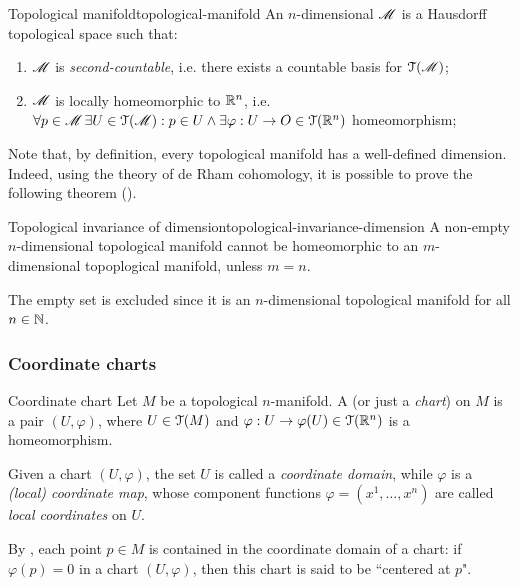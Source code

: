\begin{definition}{Topological manifold}{topological-manifold}
  An $ n $-dimensional  $ \mathscr{M} $ is a Hausdorff topological space such that:
  \begin{enumerate}
    \item $ \mathscr{M} $ is \emph{second-countable}, i.e. there exists a countable basis for $ \EuScript{T}(\mathscr{M}) $;
    \item $ \mathscr{M} $ is locally homeomorphic to $ \mathbb{R}^n $, i.e. $ \forall p\in\mathscr{M} \, \exists U \in \EuScript{T}(\mathscr{M}) : p \in U \land \exists \varphi : U \rightarrow O \in \EuScript{T}(\mathbb{R}^n) $ homeomorphism;
  \end{enumerate}
\end{definition}

Note that, by definition, every topological manifold has a well-defined dimension. Indeed, using the theory of de Rham cohomology, it is possible to prove the following theorem ().

\begin{theorem}{Topological invariance of dimension}{topological-invariance-dimension}
  A non-empty $ n $-dimensional topological manifold cannot be homeomorphic to an $ m $-dimensional topoplogical manifold, unless $ m = n $.
\end{theorem}

The empty set is excluded since it is an $ n $-dimensional topological manifold for all $ n \in \mathbb{N} $.

\subsubsection{Coordinate charts}

\begin{definition}{Coordinate chart}{}
  Let $ M $ be a topological $ n $-manifold. A  (or just a \emph{chart}) on $ M $ is a pair $ (U , \varphi) $, where $ U \in \EuScript{T}(M) $ and $ \varphi : U \rightarrow \varphi(U) \in \EuScript{T}(\mathbb{R}^n) $ is a homeomorphism.
\end{definition}

Given a chart $ (U , \varphi) $, the set $ U $ is called a \emph{coordinate domain}, while $ \varphi $ is a \emph{(local) coordinate map}, whose component functions $ \varphi = (x^1 , \dots , x^n) $ are called \emph{local coordinates} on $ U $.

By , each point $ p \in M $ is contained in the coordinate domain of a chart: if $ \varphi(p) = 0 $ in a chart $ (U , \varphi) $, then this chart is said to be ``centered at $ p $".

